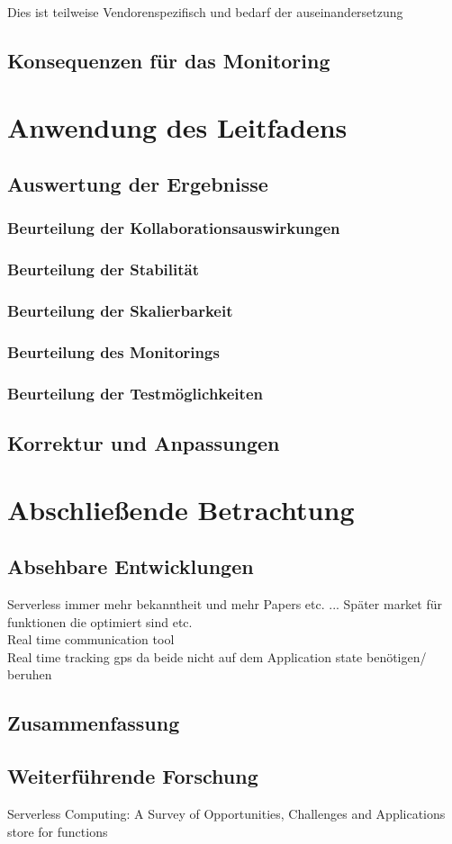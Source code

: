 \documentclass[11pt]{article}
\begin{document}
Dies ist teilweise Vendorenspezifisch und bedarf der auseinandersetzung 
\subsection{Konsequenzen für das Monitoring}
\newpage
\section{Anwendung des Leitfadens}
\subsection{Auswertung der Ergebnisse}
\subsubsection{Beurteilung der Kollaborationsauswirkungen}
\subsubsection{Beurteilung der Stabilität}
\subsubsection{Beurteilung der Skalierbarkeit} 
\subsubsection{Beurteilung des Monitorings}
\subsubsection{Beurteilung der Testmöglichkeiten} 
\subsection{Korrektur und Anpassungen}
\section{Abschließende Betrachtung}
\subsection{Absehbare Entwicklungen}
\cite{al2019systematic} Serverless  immer mehr bekanntheit und mehr Papers etc. ... Später market für funktionen die optimiert sind etc. \cite{shafiei2020serverless}\\
Real time communication tool  \cite{shafiei2020serverless} \\
Real time tracking gps  \cite{shafiei2020serverless} da beide nicht auf dem Application state benötigen/ beruhen  \cite{shafiei2020serverless} \\
\cite{hellerstein2018serverless}
\subsection{Zusammenfassung}
\subsection{Weiterführende Forschung}
Serverless Computing: A Survey of Opportunities, Challenges and Applications store for functions
\cite{shahrad2019architectural}
\newpage
\printbibliography[title={Literaturverzeichnis}]
\end{document}

